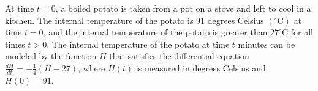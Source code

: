 \documentclass[12pt,addpoints,answers]{exam}
\begin{document}
\begin{questions}
\begin{solution}
\end{solution}

\question
At time $t=0$, a boiled potato is taken from a pot on a stove and left to cool in a kitchen. The internal temperature of the potato is 91 degrees Celsius $\left({ }^{\circ} \mathrm{C}\right)$ at time $t=0$, and the internal temperature of the potato is greater than $27^{\circ} \mathrm{C}$ for all times $t>0$. The internal temperature of the potato at time $t$ minutes can be modeled by the function $H$ that satisfies the differential equation $\frac{d H}{d t}=-\frac{1}{4}(H-27)$, where $H(t)$ is measured in degrees Celsius and $H(0)=91$.\\
\end{questions}
\end{document}
